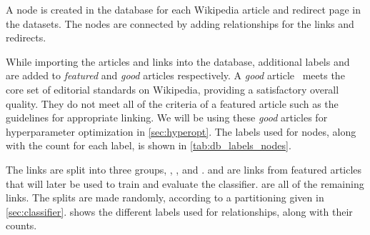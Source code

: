 A node is created in the database for each Wikipedia article and redirect page in the datasets. The nodes are connected by adding relationships for the links and redirects.

While importing the articles and links into the database, additional labels  and  are added to \emph{featured} and \emph{good} articles respectively. A \emph{good} article~\cite{wiki-good-articles} meets the core set of editorial standards on Wikipedia, providing a satisfactory overall quality. They do not meet all of the criteria of a featured article such as the guidelines for appropriate linking. We will be using these \emph{good} articles for hyperparameter optimization in \cref{sec:hyperopt}. The labels used for nodes, along with the count for each label, is shown in \cref{tab:db_labels_nodes}.

The links are split into three groups, , , and .  and  are links from featured articles that will later be used to train and evaluate the classifier.  are all of the remaining links. The splits are made randomly, according to a partitioning given in \cref{sec:classifier}.  shows the different labels used for relationships, along with their counts.


